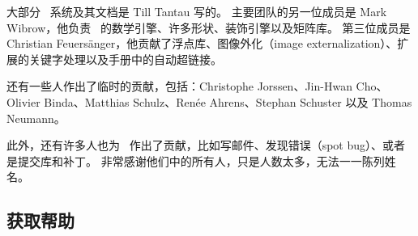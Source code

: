 \begin{onehalfspacing}
大部分 \pgfname\ 系统及其文档是 Till Tantau 写的。
主要团队的另一位成员是 Mark Wibrow，他负责 \pgfname\ 的数学引擎、许多形状、装饰引擎以及矩阵库。
第三位成员是 Christian Feuers\"anger，他贡献了浮点库、图像外化（image externalization）、扩展的关键字处理以及手册中的自动超链接。

还有一些人作出了临时的贡献，包括：Christophe Jorssen、Jin-Hwan Cho、Olivier Binda、Matthias Schulz、Ren\'ee Ahrens、Stephan Schuster 以及 Thomas Neumann。

此外，还有许多人也为 \pgfname\ 作出了贡献，比如写邮件、发现错误（spot bug）、或者是提交库和补丁。
非常感谢他们中的所有人，只是人数太多，无法一一陈列姓名。

\end{onehalfspacing}

\subsection{获取帮助}

